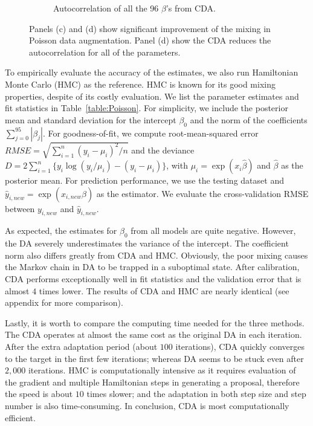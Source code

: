 \documentclass[10pt]{article}
\begin{document}
\begin{figure}[H]
\begin{subfigure}[b]{0.45\textwidth}
 \caption{Autocorrelation of all the 96 $\beta$'s from CDA.}
   \label{acf_poi_ada}
 \end{subfigure}
 \caption{Panels (c) and (d) show significant improvement of the mixing in Poisson data augmentation. Panel (d) show the CDA reduces the autocorrelation for all of the parameters.}
 \label{data_poisson}
 \end{figure}


To empirically evaluate the accuracy of the estimates, we also run Hamiltonian Monte Carlo (HMC) as the reference. HMC is known for its good mixing properties, despite of its costly evaluation. We list the parameter estimates and fit statistics in Table~\ref{table:Poisson}. For simplicity, we include the posterior mean and standard deviation for the intercept $\beta_0$ and the norm of the coefficients $\sum_{j=0}^{95} |\beta_j|$. For goodness-of-fit, we compute root-mean-squared error $RMSE= \sqrt{ \sum_{i=1}^n  (y_i-\mu_i)^2/n}$ and the deviance $D=2\sum_{i=1}^n \{ y_i \log(y_i/\mu_i) -(y_i-\mu_i)\}$, with $\mu_i=\exp( x_i{\hat\beta})$ and ${\hat\beta}$ as the posterior mean. For prediction performance, we use the testing dataset and $\hat y_{i,new}=\exp( x_{i,new}{\hat\beta})$ as the estimator. We evaluate the cross-validation RMSE between $y_{i,new}$ and $\hat y_{i,new}$.

As expected, the estimates for $\beta_0$ from all models are quite negative. However, the DA severely underestimates the variance of the intercept. The coefficient norm also differs greatly from CDA and HMC. Obviously, the poor mixing causes the Markov chain in DA to be trapped in a suboptimal state. After calibration, CDA performs exceptionally well in fit statistics and the validation error that is almost $4$ times lower. The results of CDA and HMC are nearly identical (see appendix for more comparison).

Lastly, it is worth to compare the computing time needed for the three methods. The CDA operates at almost the same cost as the original DA in each iteration. After the extra adaptation period (about $100$ iterations), CDA quickly converges to the target in the first few iterations; whereas DA seems to be stuck even after $2,000$ iterations. HMC is computationally intensive as it requires evaluation of the gradient and multiple Hamiltonian steps in generating a proposal, therefore the speed is about $10$ times slower; and the adaptation in both step size and step number is also time-consuming. In conclusion, CDA is most computationally efficient.
\end{document}
